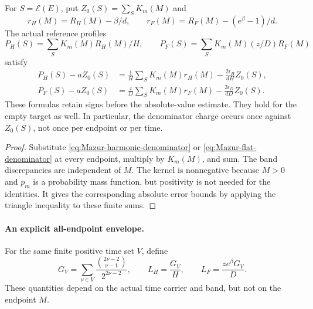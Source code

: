 \begin{proposition}
\label{prop:Mazur-profile-residual}
For $S=\mathcal E(E)$, put $Z_0(S)=\sum_SK_m(M)$ and
\[
 r_H(M)=R_H(M)-\beta/d,\qquad
 r_F(M)=R_F(M)-(e^\beta-1)/d.
\]
The actual reference profiles
\[
 P_H(S)=\sum_SK_m(M)R_H(M)/H,\qquad
 P_F(S)=\sum_SK_m(M)(z/D)R_F(M)
\]
satisfy
\begin{align}
 P_H(S)-aZ_0(S)
 &=\frac1H\sum_SK_m(M)r_H(M)
                -\frac{2\epsilon_H}{dH}Z_0(S),\\
 P_F(S)-aZ_0(S)
 &=\frac zD\sum_SK_m(M)r_F(M)
                -\frac{2\epsilon_D}{dD}Z_0(S).
 \label{eq:Mazur-common-signed}
\end{align}
These formulas retain signs before the absolute-value estimate.
They hold for the empty target as well. In particular, the
denominator charge occurs once against $Z_0(S)$, not once per
endpoint or per time.
\end{proposition}
\begin{proof}
Substitute \eqref{eq:Mazur-harmonic-denominator} or
\eqref{eq:Mazur-flat-denominator} at every endpoint, multiply by
$K_m(M)$, and sum. The band discrepancies are independent of $M$.
The kernel is nonnegative because $M>0$ and $p_m$ is a probability
mass function, but positivity is not needed for the identities.
It gives the corresponding absolute error bounds by applying the
triangle inequality to these finite sums.
\end{proof}

\paragraph{An explicit all-endpoint envelope.}
For the same finite positive time set $V$, define
\[
 G_V=\sum_{\nu\in V}
         \frac{\binom{2\nu-2}{\nu-1}}{2^{2\nu-2}},\qquad
 L_H=\frac{G_V}{H},\qquad L_F=\frac{z e^\beta G_V}{D}.
\]
These quantities depend on the actual time carrier and band,
but not on the endpoint $M$.

